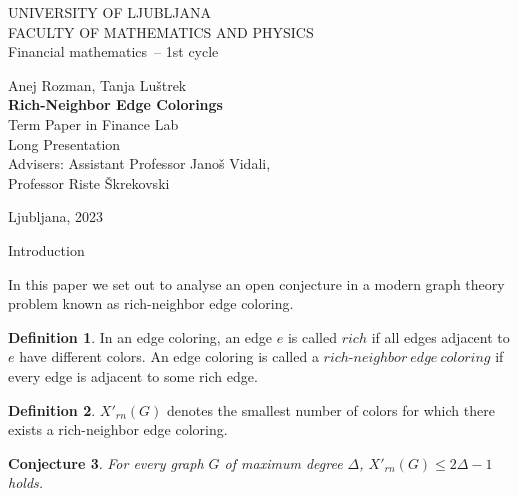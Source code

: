 \documentclass[12pt,a4paper]{amsart}
\makeatletter
\renewcommand\section{\@startsection{section}{1}
  \z@{.5\linespacing\@plus.7\linespacing}{.5\linespacing}
  {\normalfont\scshape\large\centering}}
\theoremstyle{definition} %
\newtheorem{definicija}{Definition}[section]
\theoremstyle{plain} %
\newtheorem{conjecture}[definicija]{Conjecture}
\newcommand{\program}{Financial mathematics} %
\newcommand{\imeavtorja}{Anej Rozman, Tanja Luštrek} %
\newcommand{\imementorja}{Assistant Professor Janoš Vidali} %
\newcommand{\imesomentorja}{Professor Riste Škrekovski}
\newcommand{\naslovdela}{Rich-Neighbor Edge Colorings}
\newcommand{\letnica}{2023} %
\makeatother
\begin{document}
\thispagestyle{empty}
{\large
\noindent UNIVERSITY OF LJUBLJANA\\[1mm]
FACULTY OF MATHEMATICS AND PHYSICS\\[5mm]
\program\ -- 1st cycle}
\vfill

\begin{center}{\large
\imeavtorja\\[2mm]
{\bf \naslovdela}\\[10mm]
Term Paper in Finance Lab\\[2mm]
Long Presentation\\[1cm]
Advisers: \imementorja, \\ \imesomentorja\\[2mm]}
\end{center}
\vfill

{\large
Ljubljana, \letnica}
\pagebreak

\thispagestyle{empty}
\tableofcontents
\pagebreak

\section{Introduction}

In this paper we set out to analyse an open conjecture in a modern graph theory problem known as rich-neighbor edge coloring.

\begin{definicija}
    In an edge coloring, an edge $e$ is called $rich$ if all edges adjacent to $e$ have different colors. An edge coloring is 
    called a $rich\text{-}neighbor \ edge \ coloring$ if every edge is adjacent to some rich edge.
\end{definicija}

\begin{definicija}
    $X'_{rn}(G)$ denotes the smallest number of colors for which there exists a rich-neighbor edge coloring.
\end{definicija}

\begin{conjecture}
    For every graph $G$ of maximum degree $\Delta$, $X'_{rn}(G) \leq 2\Delta - 1$ holds.
\end{conjecture}
\end{document}
